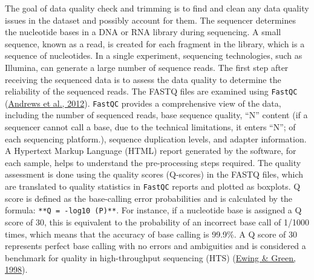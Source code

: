\documentclass[12pt,twoside]{reedthesis}
\begin{document}
The goal of data quality check and trimming is to find and clean any
data quality issues in the dataset and possibly account for them. The
sequencer determines the nucleotide bases in a DNA or RNA library during
sequencing. A small sequence, known as a read, is created for each
fragment in the library, which is a sequence of nucleotides. In a single
experiment, sequencing technologies, such as Illumina, can generate a
large number of sequence reads. The first step after receiving the
sequenced data is to assess the data quality to determine the
reliability of the sequenced reads. The FASTQ files are examined using
\texttt{FastQC} (\protect\hyperlink{ref-andrews2012}{Andrews et al., 2012}). \texttt{FastQC} provides a comprehensive view of the data,
including the number of sequenced reads, base sequence quality, ``N''
content (if a sequencer cannot call a base, due to the technical
limitations, it enters ``N''; of each sequencing platform.), sequence
duplication levels, and adapter information. A Hypertext Markup Language
(HTML) report generated by the software, for each sample, helps to
understand the pre-processing steps required. The quality assessment is
done using the quality scores (Q-scores) in the FASTQ files, which are
translated to quality statistics in \texttt{FastQC} reports and plotted as
boxplots. Q score is defined as the base-calling error probabilities and
is calculated by the formula: \texttt{**Q\ =\ -log10\ (P)**}. For instance, if a
nucleotide base is assigned a Q score of 30, this is equivalent to the
probability of an incorrect base call of 1/1000 times, which means that
the accuracy of base calling is 99.9\%. A Q score of 30 represents
perfect base calling with no errors and ambiguities and is considered a
benchmark for quality in high-throughput sequencing (HTS) (\protect\hyperlink{ref-ewing1998}{Ewing \& Green, 1998}).
\end{document}

